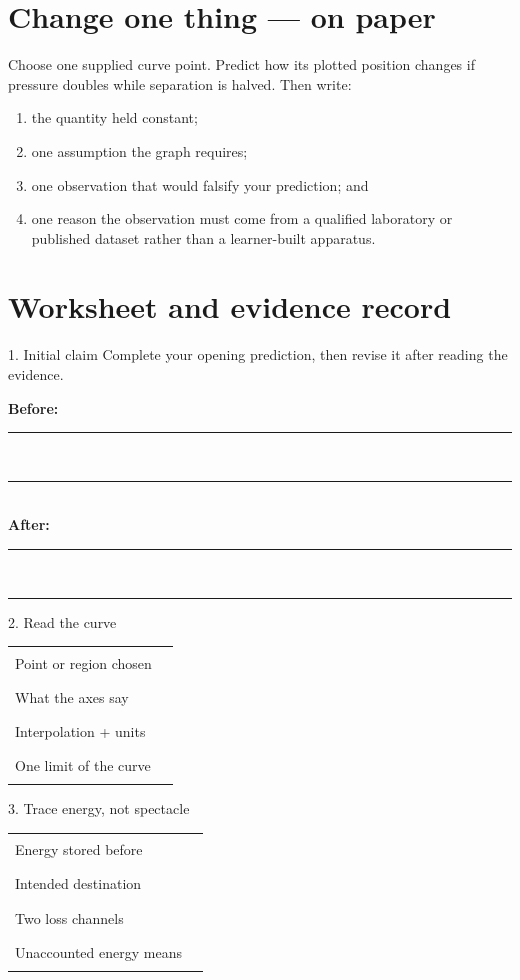 \section{Change one thing --- on paper}
Choose one supplied curve point. Predict how its plotted position changes if
pressure doubles while separation is halved. Then write:
\begin{enumerate}[leftmargin=*]
\item the quantity held constant;
\item one assumption the graph requires;
\item one observation that would falsify your prediction; and
\item one reason the observation must come from a qualified laboratory or
published dataset rather than a learner-built apparatus.
\end{enumerate}

\clearpage
\section{Worksheet and evidence record}

\begin{teloscard}{1. Initial claim}
Complete your opening prediction, then revise it after reading the evidence.
\par\smallskip
\textbf{Before:}\quad\rule{.86\linewidth}{.3pt}\\[1.2em]
\rule{\linewidth}{.3pt}\\[1.2em]
\textbf{After:}\quad\rule{.87\linewidth}{.3pt}\\[1.2em]
\rule{\linewidth}{.3pt}
\end{teloscard}

\begin{teloscard}{2. Read the curve}
\small
\begin{tabularx}{\linewidth}{@{}p{.31\linewidth}L@{}}
Point or region chosen & \rule{.95\linewidth}{.3pt}\\[1.15em]
What the axes say & \rule{.95\linewidth}{.3pt}\\[1.15em]
Interpolation + units & \rule{.95\linewidth}{.3pt}\\[1.15em]
One limit of the curve & \rule{.95\linewidth}{.3pt}
\end{tabularx}
\end{teloscard}

\begin{teloscard}{3. Trace energy, not spectacle}
\small
\begin{tabularx}{\linewidth}{@{}p{.31\linewidth}L@{}}
Energy stored before & \rule{.95\linewidth}{.3pt}\\[1.15em]
Intended destination & \rule{.95\linewidth}{.3pt}\\[1.15em]
Two loss channels & \rule{.95\linewidth}{.3pt}\\[1.15em]
Unaccounted energy means & \rule{.95\linewidth}{.3pt}
\end{tabularx}
\end{teloscard}


